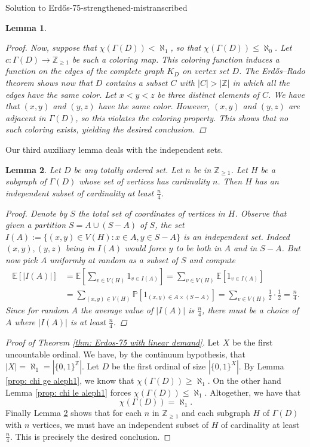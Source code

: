 \documentclass{article}
\theoremstyle{plain}
\newtheorem{lemma}{Lemma}
\theoremstyle{definition}
\begin{document}
\begin{solution}{Solution to Erd\H{o}s-75-strengthened-mistranscribed}
\begin{lemma}
\begin{proof}
Now, suppose that $\chi(\Gamma(D))<\aleph_1$, so that $\chi(\Gamma(D))\leq\aleph_0$. Let $c\colon \Gamma(D) \to \mathbb{Z}_{\geq 1}$ be such a coloring map. This coloring function induces a function on the edges of the complete graph $K_D$ on vertex set $D$. The Erd\H{o}s--Rado theorem shows now that $D$ contains a subset $C$ with $|C|>|\mathbb{Z}|$ in which all the edges have the same color. Let $x<y<z$ be three distinct elements of $C$. We have that $(x,y)$ and $(y,z)$ have the same color. However, $(x,y)$ and $(y,z)$ are adjacent in $\Gamma(D)$, so this violates the coloring property. This shows that no such coloring exists, yielding the desired conclusion. 
\end{proof}
\end{lemma}
Our third auxiliary lemma deals with the independent sets. 
\begin{lemma} \label{prop: indep set ge n/4}
Let $D$ be any totally ordered set. Let $n$ be in $\mathbb{Z}_{\geq 1}$. Let $H$ be a subgraph of $\Gamma(D)$ whose set of vertices has cardinality $n$. Then $H$ has an independent subset of cardinality at least $\frac{n}{4}$. 
\begin{proof}
Denote by $S$ the total set of coordinates of vertices in $H$. Observe that given a partition $S=A \cup (S-A)$ of $S$, the set $I(A):=\{(x,y) \in V(H): x \in A, y \in S-A\}$ is an independent set. Indeed $(x,y),(y,z)$ being in $I(A)$ would force $y$ to be both in $A$ and in $S-A$. But now pick $A$ uniformly at random as a subset of $S$ and compute
\begin{align*}
    \mathbb{E}[|I(A)|]
    &=\mathbb{E}[\sum_{v \in V(H)}1_{v \in I(A)}]
    =\sum_{v \in V(H)}\mathbb{E}[1_{v \in I(A)}]
    \\&=\sum_{(x,y) \in V(H)}\mathbb{P}[1_{(x,y) \in A \times (S-A)}]
    =\sum_{v \in V(H)}\frac{1}{2}\cdot \frac{1}{2}
    =\frac{n}{4}.
\end{align*}
Since for random $A$ the average value of $|I(A)|$ is $\frac{n}{4}$, there must be a choice of $A$ where $|I(A)|$ is at least $\frac{n}{4}$.     
\end{proof}
\end{lemma}

\begin{proof}[Proof of Theorem \ref{thm: Erdos-75 with linear demand}] Let $X$ be the first uncountable ordinal. We have, by the continuum hypothesis, that $|X|=\aleph_1=|\{0,1\}^{\mathbb{Z}}|$. Let $D$ be the first ordinal of size $|\{0,1\}^X|$. By Lemma \ref{prop: chi ge aleph1}, we know that $\chi(\Gamma(D)) \geq \aleph_1$. On the other hand Lemma \ref{prop: chi le aleph1} forces $\chi(\Gamma(D)) \leq \aleph_1$. Altogether, we have that
$$\chi(\Gamma(D))=\aleph_1.
$$
Finally Lemma \ref{prop: indep set ge n/4} shows that for each $n$ in $\mathbb{Z}_{\geq 1}$ and each subgraph $H$ of $\Gamma(D)$ with $n$ vertices, we must have an independent subset of $H$ of cardinality at least $\frac{n}{4}$. This is precisely the desired conclusion. 
\end{proof}
\end{solution}





\end{document}
